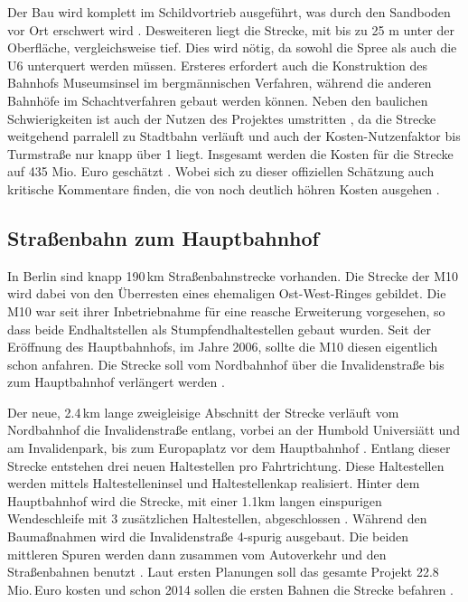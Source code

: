 Der Bau wird komplett im Schildvortrieb ausgeführt, was durch den Sandboden vor
Ort erschwert wird \cite{bkhU5}. Desweiteren liegt die Strecke, mit bis zu 25 m unter der Oberfläche,
vergleichsweise tief. Dies wird nötig, da sowohl die Spree als auch die U6
unterquert werden müssen. Ersteres erfordert auch die Konstruktion des Bahnhofs
Museumsinsel im bergmännischen Verfahren, während die anderen Bahnhöfe im
Schachtverfahren gebaut werden können. Neben den baulichen Schwierigkeiten ist
auch der Nutzen des Projektes umstritten \cite{ftdU5}, da die Strecke weitgehend
parralell zu Stadtbahn verläuft und auch der Kosten-Nutzenfaktor bis Turmstraße
nur knapp über 1 liegt. Insgesamt werden die Kosten für die Strecke auf 435
Mio. Euro geschätzt \cite{bwwwU5}. Wobei sich zu dieser offiziellen Schätzung
auch kritische Kommentare finden, die von noch deutlich höhren Kosten ausgehen
\cite{ftdU5}.

\subsection*{Straßenbahn zum Hauptbahnhof}

In Berlin sind knapp 190\,km Straßenbahnstrecke vorhanden. Die Strecke
der M10 wird dabei von den Überresten eines ehemaligen Ost-West-Ringes
gebildet. Die M10 war seit ihrer Inbetriebnahme für eine reasche
Erweiterung vorgesehen, so dass beide Endhaltstellen als
Stumpfendhaltestellen gebaut wurden. Seit der Eröffnung des
Hauptbahnhofs, im Jahre 2006, sollte die M10 diesen eigentlich schon anfahren. Die Strecke soll vom Nordbahnhof über die
Invalidenstraße bis zum Hauptbahnhof verlängert
werden \cite{tsM10}.

Der neue, 2.4\,km lange zweigleisige Abschnitt der Strecke verläuft vom
Nordbahnhof die Invalidenstraße entlang, vorbei an der Humbold
Universiätt und am Invalidenpark, bis zum Europaplatz vor dem
Hauptbahnhof \cite{M10bInfo}. Entlang dieser Strecke entstehen
drei neuen Haltestellen pro Fahrtrichtung. Diese Haltestellen werden
mittels Haltestelleninsel und Haltestellenkap realisiert. Hinter dem
Hauptbahnhof wird die Strecke, mit einer 1.1km langen einspurigen
Wendeschleife mit 3 zusätzlichen Haltestellen, abgeschlossen
\cite{zdfM10}. Während den Baumaßnahmen wird die Invalidenstraße
4-spurig ausgebaut. Die beiden mittleren Spuren werden dann zusammen
vom Autoverkehr und den Straßenbahnen benutzt
\cite{flyerInvalidestr}. Laut ersten Planungen soll das gesamte
Projekt 22.8\,Mio.\,Euro kosten und schon 2014 sollen die ersten
Bahnen die Strecke befahren \cite{mopoM10}.


